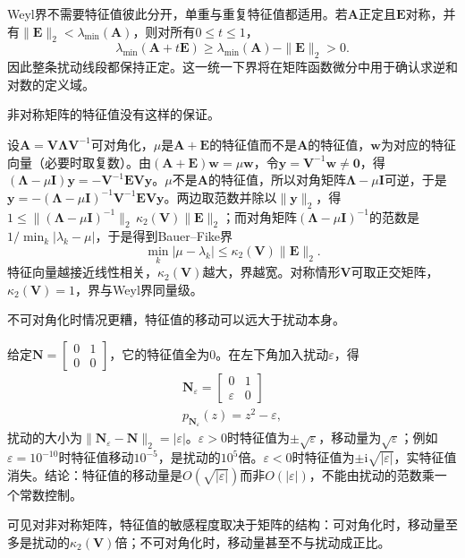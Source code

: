 Weyl界不需要特征值彼此分开，单重与重复特征值都适用。若$\bm A$正定且$\bm E$对称，并有$\|\bm E\|_2<\lambda_{\min}(\bm A)$，则对所有$0\leq t\leq1$，
\[
 \lambda_{\min}(\bm A+t\bm E)\geq\lambda_{\min}(\bm A)-\|\bm E\|_2>0.
\]
因此整条扰动线段都保持正定。这一统一下界将在矩阵函数微分中用于确认求逆和对数的定义域。


非对称矩阵的特征值没有这样的保证。

设$\bm A=\bm V\bm\Lambda\bm V^{-1}$可对角化，$\mu$是$\bm A+\bm E$的特征值而不是$\bm A$的特征值，$\bm w$为对应的特征向量（必要时取复数）。由$(\bm A+\bm E)\bm w=\mu\bm w$，令$\bm y=\bm V^{-1}\bm w\neq\bm0$，得$(\bm\Lambda-\mu\bm I)\bm y=-\bm V^{-1}\bm E\bm V\bm y$。$\mu$不是$\bm A$的特征值，所以对角矩阵$\bm\Lambda-\mu\bm I$可逆，于是$\bm y=-(\bm\Lambda-\mu\bm I)^{-1}\bm V^{-1}\bm E\bm V\bm y$。两边取范数并除以$\lVert\bm y\rVert_2$，得$1\leq\lVert(\bm\Lambda-\mu\bm I)^{-1}\rVert_2\,\kappa_2(\bm V)\lVert\bm E\rVert_2$；而对角矩阵$(\bm\Lambda-\mu\bm I)^{-1}$的范数是$1/\min_k|\lambda_k-\mu|$，于是得到Bauer--Fike界
\[
 \min_k|\mu-\lambda_k|\leq\kappa_2(\bm V)\lVert\bm E\rVert_2 .
\]
特征向量越接近线性相关，$\kappa_2(\bm V)$越大，界越宽。对称情形$\bm V$可取正交矩阵，$\kappa_2(\bm V)=1$，界与Weyl界同量级。

不可对角化时情况更糟，特征值的移动可以远大于扰动本身。
\begin{example}[反例：特征值的移动远大于扰动]
\label{ex:ls-jordan-eigenvalue-sensitivity}
给定$\bm N=\left[\begin{smallmatrix}0&1\\0&0\end{smallmatrix}\right]$，它的特征值全为$0$。在左下角加入扰动$\varepsilon$，得
\[
\begin{gathered}
\bm N_\varepsilon=\begin{bmatrix}0&1\\\varepsilon&0\end{bmatrix}\\
p_{\bm N_\varepsilon}(z)=z^2-\varepsilon ,
\end{gathered}
\]
扰动的大小为$\lVert\bm N_\varepsilon-\bm N\rVert_2=|\varepsilon|$。$\varepsilon>0$时特征值为$\pm\sqrt\varepsilon$，移动量为$\sqrt\varepsilon$；例如$\varepsilon=10^{-10}$时特征值移动$10^{-5}$，是扰动的$10^5$倍。$\varepsilon<0$时特征值为$\pm\mathrm i\sqrt{|\varepsilon|}$，实特征值消失。结论：特征值的移动量是$O(\sqrt{|\varepsilon|})$而非$O(|\varepsilon|)$，不能由扰动的范数乘一个常数控制。
\end{example}
可见对非对称矩阵，特征值的敏感程度取决于矩阵的结构：可对角化时，移动量至多是扰动的$\kappa_2(\bm V)$倍；不可对角化时，移动量甚至不与扰动成正比。

